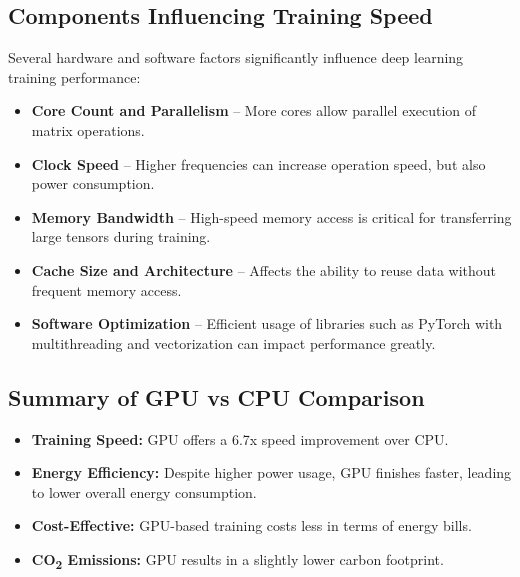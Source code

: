 \subsection{Components Influencing Training Speed}

Several hardware and software factors significantly influence deep learning training performance:

\begin{itemize}
    \item \textbf{Core Count and Parallelism} – More cores allow parallel execution of matrix 
    operations. 

    \item \textbf{Clock Speed} – Higher frequencies can increase operation speed, but also power 
    consumption. 

    \item \textbf{Memory Bandwidth} – High-speed memory access is critical for transferring large 
    tensors during training. 

    \item \textbf{Cache Size and Architecture} – Affects the ability to reuse data without frequent 
    memory access. 

    \item \textbf{Software Optimization} – Efficient usage of libraries such as PyTorch with 
    multithreading and vectorization can impact performance greatly. 
\end{itemize}


\subsection{Summary of GPU vs CPU Comparison}

\begin{itemize}
    \item \textbf{Training Speed:} GPU offers a 6.7x speed improvement over CPU.
    \item \textbf{Energy Efficiency:} Despite higher power usage, GPU finishes faster, leading to 
    lower overall energy consumption.
    \item \textbf{Cost-Effective:} GPU-based training costs less in terms of energy bills.
    \item \textbf{CO\textsubscript{2} Emissions:} GPU results in a slightly lower carbon footprint.
\end{itemize}
